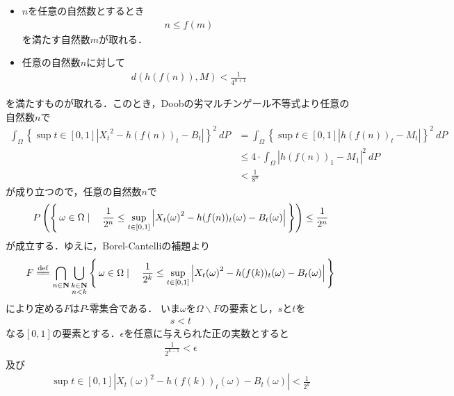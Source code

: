 \begin{sketch}
\begin{description}
\begin{itemize}
					\item $n$を任意の自然数とするとき
						\begin{align}
							n \leq f(m)
						\end{align}
						を満たす自然数$m$が取れる．
						
					\item 任意の自然数$n$に対して
						\begin{align}
							d(h(f(n)),M) < \frac{1}{4^{n+1}}
						\end{align}
				\end{itemize}
				を満たすものが取れる．このとき，Doobの劣マルチンゲール不等式より任意の自然数$n$で
				\begin{align}
					\int_\Omega \left\{\sup{t \in [0,1]}{\left|{X_{t}}^{2} - h(f(n))_{t} - B_{t}\right|}\right\}^{2}\ dP
					&= \int_\Omega \left\{\sup{t \in [0,1]}{\left|h(f(n))_{t} - M_{t}\right|}\right\}^{2}\ dP \\
					&\leq 4 \cdot \int_\Omega \left|h(f(n))_{1} - M_{1}\right|^{2}\ dP \\
					&< \frac{1}{8^{n}}
				\end{align}
				が成り立つので，任意の自然数$n$で
				\begin{align}
					P\left(\left\{\, \omega \in \Omega \mid \quad 
					\frac{1}{2^{n}} \leq \operatorname*{sup}_{t \in [0,1]} \left|{X_{t}(\omega)}^{2} - h(f(n))_{t}(\omega) - B_{t}(\omega) \right|\, \right\}\right)
					\leq \frac{1}{2^{n}}
				\end{align}
				が成立する．ゆえに，Borel-Cantelliの補題より
				\begin{align}
					F \defeq \bigcap_{n \in \Natural} \bigcup_{\substack{k \in \Natural \\ n < k}} 
					\Set{\omega \in \Omega}{\frac{1}{2^{k}} \leq \sup{t \in [0,1]}{\left|{X_{t}(\omega)}^{2} - h(f(k))_{t}(\omega) - B_{t}(\omega) \right|}}
				\end{align}
				により定める$F$は$P$-零集合である．
				いま$\omega$を$\Omega \backslash F$の要素とし，$s$と$t$を
				\begin{align}
					s < t
				\end{align}
				なる$[0,1]$の要素とする．$\epsilon$を任意に与えられた正の実数とすると
				\begin{align}
					\frac{1}{2^{k-1}} < \epsilon
				\end{align}
				及び
				\begin{align}
					\sup{t \in [0,1]}{\left|{X_{t}(\omega)}^{2} - h(f(k))_{t}(\omega) - B_{t}(\omega)\right|} < \frac{1}{2^{k}}
				\end{align}

\end{description}
\end{sketch}
